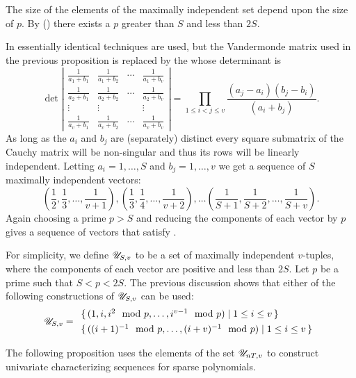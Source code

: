 The size of the elements of the maximally independent set depend upon
the size of $p$.  By 
() there exists a $p$ greater than
$S$ and less than $2S$.  

In \cite{Grigoriev90} essentially identical techniques are used, but
the Vandermonde matrix used in the previous proposition is replaced by
the  whose determinant is
\begin{equation}\label{Zero:Cauchy:Eq}
\det\left|
  \begin{array}{cccc}
\frac{1}{a_1+b_1} & \frac{1}{a_1+b_2} & \cdots & \frac{1}{a_1+b_v} \\[3pt]
\frac{1}{a_2+b_1} & \frac{1}{a_2+b_2} & \cdots & \frac{1}{a_2+b_v} \\[3pt]
\vdots & \vdots & & \vdots \\[3pt]
\frac{1}{a_v+b_1} & \frac{1}{a_v+b_2} & \cdots & \frac{1}{a_v+b_v} 
\end{array}\right|
=
\prod_{1\le i < j \le v}\frac{(a_j - a_i) (b_j - b_i)}{(a_i + b_j)}.
\end{equation}
As long as the $a_i$ and $b_j$ are (separately) distinct every square
submatrix of the Cauchy matrix will be non-singular and thus its rows will
be linearly independent.  Letting $a_i = 1, \ldots, S$ and $b_j = 1,
\ldots, v$ we get a sequence  of $S$ maximally independent vectors:
\[
(\frac{1}{2}, \frac{1}{3}, \ldots, \frac{1}{v+1}), 
(\frac{1}{3}, \frac{1}{4}, \ldots, \frac{1}{v+2}), \ldots
(\frac{1}{S+1}, \frac{1}{S+2}, \ldots, \frac{1}{S+v}).
\]
Again choosing a prime $p > S$ and reducing the components of each
vector by $p$ gives a sequence of vectors that satisfy
.  

For simplicity, we define ${\cal U}_{S,v}$ to be a set of maximally
independent $v$-tuples, where the components of each vector are
positive and less than $2S$.  Let $p$ be a prime such that $S < p
<2S$.  The previous discussion shows that either of the following
constructions of ${\cal U}_{S,v}$ can be used:
\[
{\cal U}_{S,v} =
\begin{array}{l}
  \{\, (1, i, i^2\mod p, \ldots, i^{v-1} \mod p) \mid 1 \le i \le v \,
\} \\[4pt]
  \{\, ((i+1)^{-1} \mod p, \ldots, (i+v)^{-1} \mod p) 
      \mid 1 \le i \le v \,\}
\end{array}
\]

\medskip
The following proposition uses the elements of the set ${\cal
U}_{nT,v}$ to construct univariate characterizing sequences for sparse 
polynomials.


